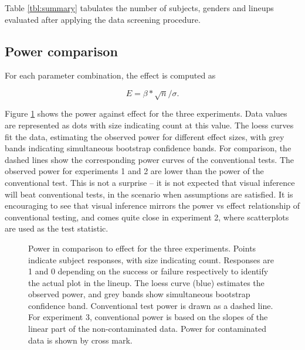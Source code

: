 \documentclass{article}
\begin{document}
Table \ref{tbl:summary} tabulates the number of subjects, genders and lineups evaluated after applying the data screening procedure. 

\subsection{Power comparison}

For each parameter combination, the effect is computed as 

\[
E=\beta*\sqrt {n}/\sigma.
\]

\noindent Figure \ref{fig:power_loess_effect} shows the power against effect for the three experiments. Data values are represented as dots with size indicating count at this value. The loess curves fit the data, estimating the observed power for different effect sizes, with grey bands indicating simultaneous bootstrap confidence bands. For comparison, the dashed lines show the corresponding power curves of the conventional tests. The observed power for experiments 1 and 2 are lower than the power of the conventional test. This is not a surprise -- it is not expected that visual inference will beat conventional tests, in the scenario when assumptions are satisfied. It is encouraging to see that visual inference mirrors the power vs effect relationship of conventional testing, and comes quite close in experiment 2, where scatterplots are used as the test statistic. 

\begin{figure}[hbtp]
   \centering
       \caption{Power in comparison to effect for the three experiments. Points indicate subject responses, with size indicating count. Responses are 1 and 0 depending on the success or failure respectively to identify the actual plot in the lineup. The loess curve (blue) estimates the observed power, and grey bands show simultaneous bootstrap confidence band.  Conventional test power is drawn as a dashed line. For experiment 3, conventional power is based on the slopes of the linear part of the non-contaminated data. Power for contaminated data is shown by cross mark.
}
       \label{fig:power_loess_effect}
\end{figure}
\end{document}
